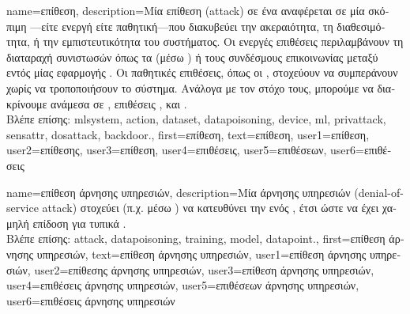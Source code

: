 {name={\foreignlanguage{greek}{επίθεση}},
	description={\foreignlanguage{greek}{Μία επίθεση} (attack)  \foreignlanguage{greek}{σε ένα}
		 \foreignlanguage{greek}{αναφέρεται σε μία σκόπιμη} —\foreignlanguage{greek}{είτε 
		ενεργή είτε παθητική—που διακυβεύ\-ει την ακεραιότητα, τη διαθεσιμότητα, ή την εμπιστευτικότητα του συστήματος. 
		Οι ενεργές επιθέσεις περιλαμβάνουν τη διαταραχή συνιστωσών όπως τα}  (\foreignlanguage{greek}{μέσω} 
		) \foreignlanguage{greek}{ή τους συνδέσμους επικοινωνίας μεταξύ}  
		\foreignlanguage{greek}{εντός μίας εφαρμογής} . \foreignlanguage{greek}{Οι παθητικές επιθέσεις, όπως οι} 
		, \foreignlanguage{greek}{στοχεύουν να συμπεράνουν}  \foreignlanguage{greek}{χωρίς 
		να τροποποιήσουν το σύστημα. Ανάλογα με τον στόχο τους, μπορούμε να διακρίνουμε ανάμεσα σε} , 
		\foreignlanguage{greek}{επιθέσεις} , \foreignlanguage{greek}{και} .
		\\
		\foreignlanguage{greek}{Βλέπε επίσης:} \gls{mlsystem}, \gls{action}, \gls{dataset}, \gls{datapoisoning}, \gls{device}, \gls{ml}, 
		\gls{privattack}, \gls{sensattr}, \gls{dosattack}, \gls{backdoor}.},
	first={\foreignlanguage{greek}{επίθεση}},
	text={\foreignlanguage{greek}{επίθεση}},
	user1={\foreignlanguage{greek}{επίθεση}}, %
  	user2={\foreignlanguage{greek}{επίθεσης}}, %
	user3={\foreignlanguage{greek}{επίθεση}}, %
  	user4={\foreignlanguage{greek}{επιθέσεις}}, %
	user5={\foreignlanguage{greek}{επιθέσεων}}, %
  	user6={\foreignlanguage{greek}{επιθέσεις}} %
}

{name={\foreignlanguage{greek}{επίθεση άρνησης υπηρεσιών}}, 
	description={\foreignlanguage{greek}{Μία}  
		\foreignlanguage{greek}{άρνησης υπηρεσιών} (denial-of-service attack) \foreignlanguage{greek}{στοχεύει (π.χ. μέσω} 
		) \foreignlanguage{greek}{να κατευθύνει την}  \foreignlanguage{greek}{ενός} 
		, \foreignlanguage{greek}{έτσι ώστε να έχει χαμηλή επίδοση για τυπικά} .
		\\
		\foreignlanguage{greek}{Βλέπε επίσης:} \gls{attack}, \gls{datapoisoning}, \gls{training}, \gls{model}, \gls{datapoint}.},
	first={\foreignlanguage{greek}{επίθεση άρνησης υπηρεσιών}},
	text={\foreignlanguage{greek}{επίθεση άρνησης υπηρεσιών}},
	user1={\foreignlanguage{greek}{επίθεση άρνησης υπηρεσιών}}, %
  	user2={\foreignlanguage{greek}{επίθεσης άρνησης υπηρεσιών}}, %
	user3={\foreignlanguage{greek}{επίθεση άρνησης υπηρεσιών}}, %
  	user4={\foreignlanguage{greek}{επιθέσεις άρνησης υπηρεσιών}}, %
	user5={\foreignlanguage{greek}{επιθέσεων άρνησης υπηρεσιών}}, %
  	user6={\foreignlanguage{greek}{επιθέσεις άρνησης υπηρεσιών}} %
}

